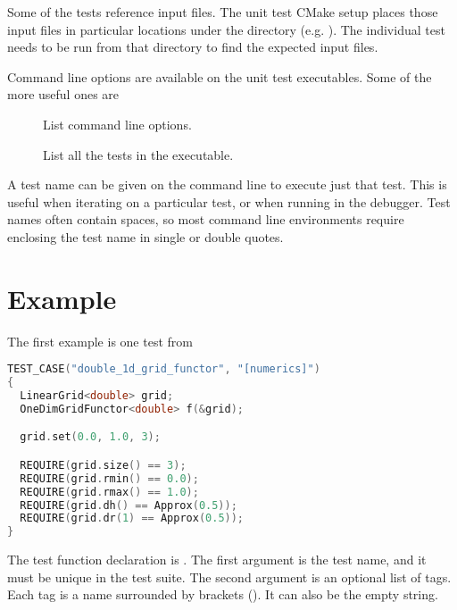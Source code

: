 Some of the tests reference input files. The unit test CMake setup places those input files in particular locations under the  directory (e.g. ).  The individual test needs to be run from that directory to find the expected input files.

Command line options are available on the unit test executables.  Some of the more useful ones are
\begin{description}
\item[]  List command line options.
\item [] List all the tests in the executable.
\end{description}

A test name can be given on the command line to execute just that test.  This is useful when iterating
on a particular test, or when running in the debugger.   Test names often contain spaces, so most command line environments require enclosing the test name in single or double quotes.



\section{Example}

The first example is one test from 

\begin{minipage}{\linewidth}
\begin{lstlisting}[language=C++,caption={Unit test example using Catch},label=CatchExample,basicstyle=\ttfamily]
TEST_CASE("double_1d_grid_functor", "[numerics]")
{
  LinearGrid<double> grid;
  OneDimGridFunctor<double> f(&grid);

  grid.set(0.0, 1.0, 3);

  REQUIRE(grid.size() == 3);
  REQUIRE(grid.rmin() == 0.0);
  REQUIRE(grid.rmax() == 1.0);
  REQUIRE(grid.dh() == Approx(0.5));
  REQUIRE(grid.dr(1) == Approx(0.5));
}
\end{lstlisting}
\end{minipage}

The test function declaration is
.
The first argument is the test name, and it must be unique in the test suite.
The second argument is an optional list of tags.  Each tag is a name surrounded by brackets ().  It can also be the empty string.

